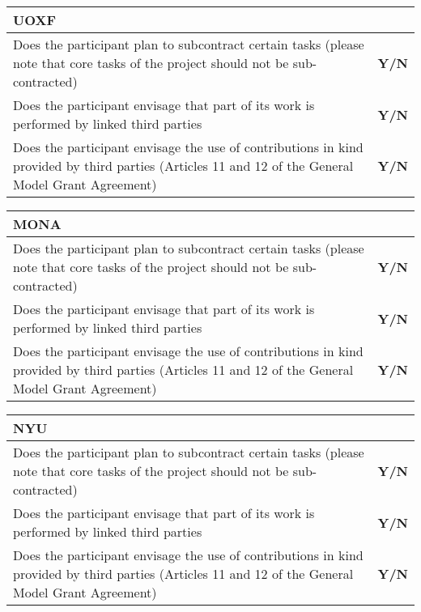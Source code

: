 \begin{tabular}{|p{}|p{}|}
  \hline  
  \multicolumn{2}{|l|}{\cellcolor[gray]{0.8}\textbf{UOXF}}\\
  \hline
  Does the participant plan to subcontract certain tasks (please note that core tasks of the project should not be sub-contracted) &
  \textbf{Y/N} \\
  \hline
Does the participant envisage that part of its work is performed by linked
third parties &
  \textbf{Y/N} \\
  \hline
  Does the participant envisage the use of contributions in kind provided by
third parties (Articles 11 and 12 of the General Model Grant Agreement) &
  \textbf{Y/N}\\
  \hline
\end{tabular}

\begin{tabular}{|p{}|p{}|}
  \hline  
  \multicolumn{2}{|l|}{\cellcolor[gray]{0.8}\textbf{MONA}}\\
  \hline
  Does the participant plan to subcontract certain tasks (please note that core tasks of the project should not be sub-contracted) &
  \textbf{Y/N} \\
  \hline
Does the participant envisage that part of its work is performed by linked
third parties &
  \textbf{Y/N} \\
  \hline
  Does the participant envisage the use of contributions in kind provided by
third parties (Articles 11 and 12 of the General Model Grant Agreement) &
  \textbf{Y/N}\\
  \hline
\end{tabular}

\begin{tabular}{|p{}|p{}|}
  \hline  
  \multicolumn{2}{|l|}{\cellcolor[gray]{0.8}\textbf{NYU}}\\
  \hline
  Does the participant plan to subcontract certain tasks (please note that core tasks of the project should not be sub-contracted) &
  \textbf{Y/N} \\
  \hline
Does the participant envisage that part of its work is performed by linked
third parties &
  \textbf{Y/N} \\
  \hline
  Does the participant envisage the use of contributions in kind provided by
third parties (Articles 11 and 12 of the General Model Grant Agreement) &
  \textbf{Y/N}\\
  \hline
\end{tabular}

